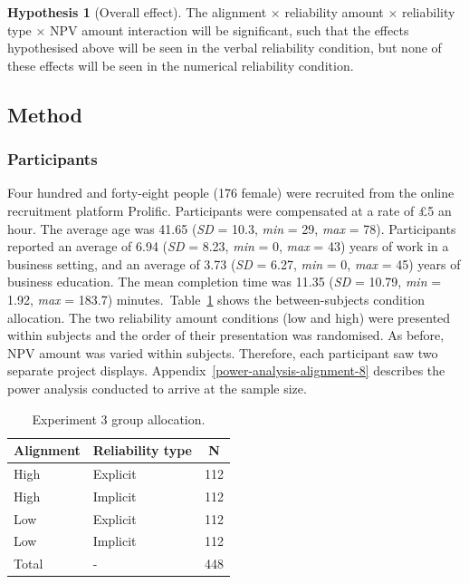 \documentclass[a4paper, nobind, dvipsnames]{templates/ociamthesis}
\theoremstyle{definition}
\theoremstyle{definition}
\theoremstyle{definition}
\theoremstyle{definition}
\newtheorem{hypothesis}{Hypothesis}[chapter]
\theoremstyle{remark}
\begin{document}
\begin{hypothesis}[Overall effect]
\protect\hypertarget{hyp:four-way-alignment-8}{}{\label{hyp:four-way-alignment-8} {} }The alignment \(\times\) reliability amount \(\times\) reliability type \(\times\) NPV
amount interaction will be significant, such that the effects hypothesised above
will be seen in the verbal reliability condition, but none of these effects
will be seen in the numerical reliability condition.
\end{hypothesis}

\subsection{Method}

\subsubsection{Participants}

Four hundred and forty-eight people (176 female) were recruited from the online recruitment platform Prolific. Participants were compensated at a rate of £5 an hour. The average age was 41.65 (\emph{SD} = 10.3, \emph{min} = 29, \emph{max} = 78). Participants reported an average of 6.94 (\emph{SD} = 8.23, \emph{min} = 0, \emph{max} = 43) years of work in a business setting, and an average of 3.73 (\emph{SD} = 6.27, \emph{min} = 0, \emph{max} = 45) years of business education. The mean completion time was 11.35 (\emph{SD} = 10.79, \emph{min} = 1.92, \emph{max} = 183.7) minutes.~Table~\ref{tab:condition-allocation-alignment-8}
shows the between-subjects condition allocation. The two reliability amount
conditions (low and high) were presented within subjects and the order of their
presentation was randomised. As before, NPV amount was varied within subjects.
Therefore, each participant saw two separate project displays.
Appendix~\ref{power-analysis-alignment-8} describes the power analysis
conducted to arrive at the sample size.

\begin{table}[tbp]

\begin{center}
\begin{threeparttable}

\caption{\label{tab:condition-allocation-alignment-8}Experiment 3 group allocation.}

\begin{tabular}{lll}
\toprule
Alignment & \multicolumn{1}{c}{Reliability type} & \multicolumn{1}{c}{N}\\
\midrule
High & Explicit & 112\\
High & Implicit & 112\\
Low & Explicit & 112\\
Low & Implicit & 112\\
Total & - & 448\\
\bottomrule
\end{tabular}

\end{threeparttable}
\end{center}

\end{table}
\end{document}

